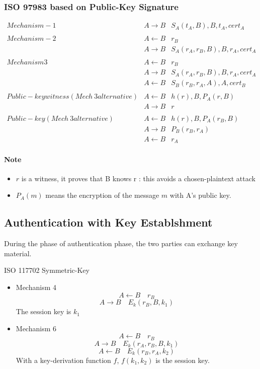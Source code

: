 \subsubsection{ISO 9798\text{-}3 based on Public-Key Signature}
\begin{eqnarray*}
    Mechanism-1 \quad & A \rightarrow B & S_A(t_A,B),B,t_A,cert_A \\
    \\
    Mechanism-2 \quad & A \leftarrow B & r_B\\
                      & A \rightarrow B &
    S_A(r_A,r_B,B),B,r_A,cert_A \\
    \\
    Mechanism 3 \quad & A \leftarrow B & r_B \\
                      & A \rightarrow B &
    S_A(r_A,r_B,B),B,r_A,cert_A \\
    & A \leftarrow B & S_B(r_B, r_A, A), A, cert_B \\
    \\
    Public-key witness (Mech~3 alternative) & A \leftarrow B & h(r), B, P_A(r, B) \\
    & A \rightarrow B & r \\
    \\
    Public-key (Mech~3 alternative) & A \leftarrow B & h(r), B, P_A(r_B, B) \\
                                    & A \rightarrow B & P_B(r_B, r_A)\\
                                    & A \leftarrow B & r_A
\end{eqnarray*}

\paragraph{Note} 
\begin{itemize}
    \item $r$ is a witness, it proves that B knows r : this avoids a
        chosen-plaintext attack
    \item $P_A(m)$ means the
        encryption of the message $m$ with A’s public key.
\end{itemize}

\subsection{Authentication with Key Establshment}
During the phase of authentication phase, the two parties can exchange key
material.

ISO 11770\text{-}2 Symmetric-Key
\begin{itemize}
    \item Mechanism 4
        $$ A \leftarrow B \quad r_B $$
        $$ A \rightarrow B \quad E_k(r_B,B,k_1) $$
        The session key is $k_1$

    \item Mechanism 6
        $$ A \leftarrow B \quad r_B $$
        $$ A \rightarrow B \quad E_k(r_A,r_B,B,k_1) $$
        $$ A \leftarrow B \quad E_k(r_B,r_A,k_2) $$
        With a key-derivation function $f$, $f(k_1,k_2)$ is the session key.
\end{itemize}

